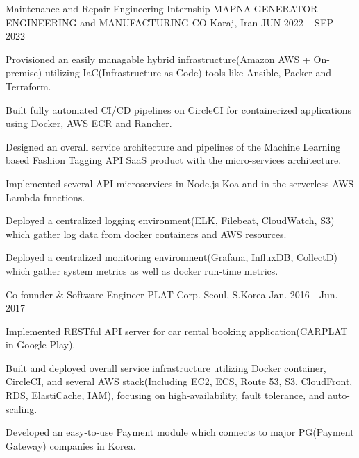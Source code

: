 

\begin{cventries}

  \cventry
    {Maintenance and Repair Engineering Internship} %
    {MAPNA GENERATOR ENGINEERING and MANUFACTURING CO} %
    {Karaj, Iran} %
    {JUN 2022 – SEP 2022} %
    {
      \begin{cvitems} %
        \item {Provisioned an easily managable hybrid infrastructure(Amazon AWS + On-premise) utilizing IaC(Infrastructure as Code) tools like Ansible, Packer and Terraform.}
        \item {Built fully automated CI/CD pipelines on CircleCI for containerized applications using Docker, AWS ECR and Rancher.}
        \item {Designed an overall service architecture and pipelines of the Machine Learning based Fashion Tagging API SaaS product with the micro-services architecture.}
        \item {Implemented several API microservices in Node.js Koa and in the serverless AWS Lambda functions.}
        \item {Deployed a centralized logging environment(ELK, Filebeat, CloudWatch, S3) which gather log data from docker containers and AWS resources.}
        \item {Deployed a centralized monitoring environment(Grafana, InfluxDB, CollectD) which gather system metrics as well as docker run-time metrics.}
      \end{cvitems}
    }

  \cventry
    {Co-founder \& Software Engineer} %
    {PLAT Corp.} %
    {Seoul, S.Korea} %
    {Jan. 2016 - Jun. 2017} %
    {
      \begin{cvitems} %
        \item {Implemented RESTful API server for car rental booking application(CARPLAT in Google Play).}
        \item {Built and deployed overall service infrastructure utilizing Docker container, CircleCI, and several AWS stack(Including EC2, ECS, Route 53, S3, CloudFront, RDS, ElastiCache, IAM), focusing on high-availability, fault tolerance, and auto-scaling.}
        \item {Developed an easy-to-use Payment module which connects to major PG(Payment Gateway) companies in Korea.}
      \end{cvitems}
    }


\end{cventries}
